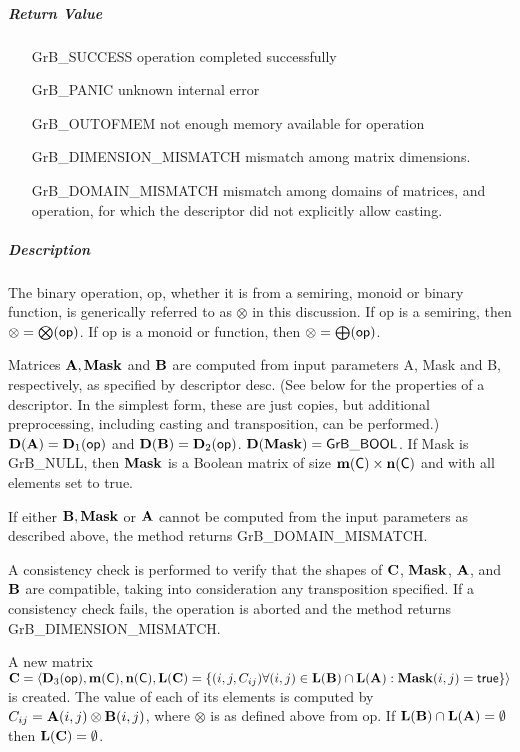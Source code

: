\subparagraph{Return Value}

\begin{itemize}[leftmargin=2.1in]
    \item[{\sf GrB\_SUCCESS}]             operation completed successfully
    \item[{\sf GrB\_PANIC}]               unknown internal error
    \item[{\sf GrB\_OUTOFMEM}]            not enough memory available for operation
    \item[{\sf GrB\_DIMENSION\_MISMATCH}] mismatch among matrix dimensions.
    \item[{\sf GrB\_DOMAIN\_MISMATCH}]    mismatch among domains of matrices, and operation, for which the descriptor did not explicitly allow casting.
\end{itemize}

\subparagraph{Description}

The binary operation, {\sf op}, whether it is from a semiring, monoid or binary function,
is generically referred to as $\otimes$ in this discussion.
If {\sf op} is a semiring, then $\otimes = \bigotimes({\sf op})$. 
If {\sf op} is a monoid or function, then $\otimes = \bigoplus({\sf op})$.

Matrices ${\bf A}, {\bf Mask}$ and ${\bf B}$ are computed from
input parameters {\sf A}, {\sf Mask} and {\sf B}, respectively, as specified
by descriptor {\sf desc}. (See below for the properties of a descriptor. In
the simplest form, these are just copies, but additional preprocessing,
including casting and transposition, can be performed.)  $\bold{D}({\bf A}) =
\bold{D}_1({\sf op})$ and $\bold{D}({\bf B}) = \bold{D}_2({\sf op})$.
$\bold{D}({\bf Mask}) = {\sf GrB\_BOOL}$.  If {\sf Mask} is {\sf GrB\_NULL},
then ${\bf Mask}$ is a Boolean matrix of size $\bold{m}({\bf \sf C}) \times \bold{n}({\bf \sf C})$
and with all elements set to {\sf true}.

If either ${\bf B}, {\bf Mask}$ or ${\bf A}$ cannot be computed
from the input parameters as described above, the method returns {\sf
    GrB\_DOMAIN\_MISMATCH}.

A consistency check is performed to verify that the 
shapes of ${\bf C}$, ${\bf Mask}$, ${\bf A}$, and ${\bf B}$
are compatible, taking into consideration any transposition specified.
If a consistency
check fails, the operation is aborted and the method returns {\sf
    GrB\_DIMENSION\_MISMATCH}.

A new matrix ${\bf C} = \langle \bold{D}_3({\sf op}), \bold{m}({\bf \sf C}),
\bold{n}({\bf \sf C}), \bold{L}({\bf C}) = \{(i,j,C_{ij})  \forall (i,j) \in
\bold{L}({\bf B}) \cap \bold{L}({\bf A}) : {\bf Mask}(i,j)
= {\sf true} \} \rangle$ is created.  The value of each of its
elements is computed by $C_{ij} = {\bf A}(i,j) \otimes {\bf B}(i,j)$,
where $\otimes$ is as defined above from {\sf op}.
If $\bold{L}({\bf B}) \cap \bold{L}({\bf A}) = \emptyset$
then $\bold{L}({\bf C}) = \emptyset$.

